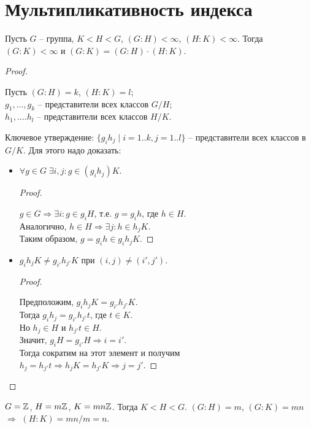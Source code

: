 \section{Мультипликативность индекса}
\begin{theorem-non}
    Пусть $G$ -- группа, $K < H < G$, $(G : H) < \infty$,
    $(H : K) < \infty$. Тогда $(G : K) < \infty$ и
    $(G : K) = (G : H) \cdot (H : K)$.
\end{theorem-non}
\begin{proof} $ $

    Пусть $(G : H) = k$, $(H : K) = l$; \\
    $g_1, \dots, g_k$ -- представители всех классов $G/H$; \\
    $h_1, \dots. h_l$ -- представители всех классов $H/K$.

    Ключевое утверждение: $\{ g_i h_j \mid i = 1..k, j = 1..l \}$
    -- представители всех классов в $G/K$. Для этого надо
    доказать:
    \begin{itemize}
        \item $\forall g \in G \; \exists i, j : g \in (g_i h_j) K$.
        \begin{proof} $ $

            $g \in G \Rightarrow \exists i : g \in g_i H$,
            т.е. $g = g_i h$, где $h \in H$. \\
            Аналогично, $h \in H \Rightarrow \exists j : h \in h_j K$.\\
            Таким образом, $g = g_i h \in g_i h_j K$.
        \end{proof}
        \item $g_i h_j K \neq g_{i'} h_{j'} K$ при 
        $(i, j) \neq (i', j')$.
        \begin{proof} $ $

            Предположим, $g_i h_j K = g_{i'} h_{j'} K$. \\
            Тогда $g_i h_j = g_{i'} h_{j'} t$, где $t \in K$. \\
            Но $h_j \in H$ и $h_{j'} t \in H$. \\ 
            Значит, $g_i H = g_{i'} H \Rightarrow i = i'$. \\
            Тогда сократим
            на этот элемент и получим \\ $h_j = h_{j'} t
            \Rightarrow h_j K = h_{j'} K \Rightarrow j = j'$.
        \end{proof}
    \end{itemize}
\end{proof}

\begin{example}
    $G = \mathbb{Z}$, $H = m\mathbb{Z}$, $K = mn\mathbb{Z}$. Тогда $K < H < G$.
    $(G : H) = m$, $(G : K) = mn$ $\Rightarrow$ $(H : K) = mn/m = n$.
\end{example}